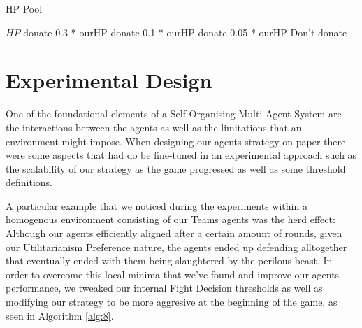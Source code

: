 

\begin{algorithm}
\caption{HP Pool}\label{alg:35}
\begin{algorithmic} 
\scriptsize
\Require $HP$
\State donate 0.3 * ourHP
\Else
{} 
\State donate 0.1 * ourHP
\Else 
{}
\State donate 0.05 * ourHP
\Else
\State Don't donate
\EndIf
\EndIf
\EndIf

\end{algorithmic}
\end{algorithm}


\section{Experimental Design}

One of the foundational elements of a Self-Organising Multi-Agent System are the interactions between the agents as well as the limitations that an environment might impose. When designing our agents strategy on paper there were some aspects that had do be fine-tuned in an experimental approach such as the scalability of our strategy as the game progressed as well as some threshold definitions.

A particular example that we noticed during the experiments within a homogenous environment consisting of our Teams agents was the herd effect: Although our agents efficiently aligned after a certain amount of rounds, given our Utilitarianism Preference nature, the agents ended up defending alltogether that eventually ended with them being slaughtered by the perilous beast. In order to overcome this local minima that we've found and improve our agents performance, we tweaked our internal Fight Decision thresholds as well as modifying our strategy to be more aggresive at the beginning of the game, as seen in Algorithm \ref{alg:8}.



